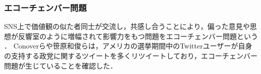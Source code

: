 \documentclass[12pt,a4j,dvipdfmx]{jreport}
\begin{document}


\subsubsection{エコーチェンバー問題}
SNS上で価値観の似た者同士が交流し，共感し合うことにより，偏った意見や思想が反響室のように増幅されて影響力をもつ問題をエコーチェンバー問題という\cite{bruns_filter_2019}
\cite{nguyen_echo_2020}．
Conoverらや笹原和俊らは，アメリカの選挙期間中のTwitterユーザーが自身の支持する政党に関するツイートを多くリツイートしており，エコーチェンバー問題が生じていることを確認した\cite{conover_partisan_2012}\cite{__2020-5}．
\end{document}
